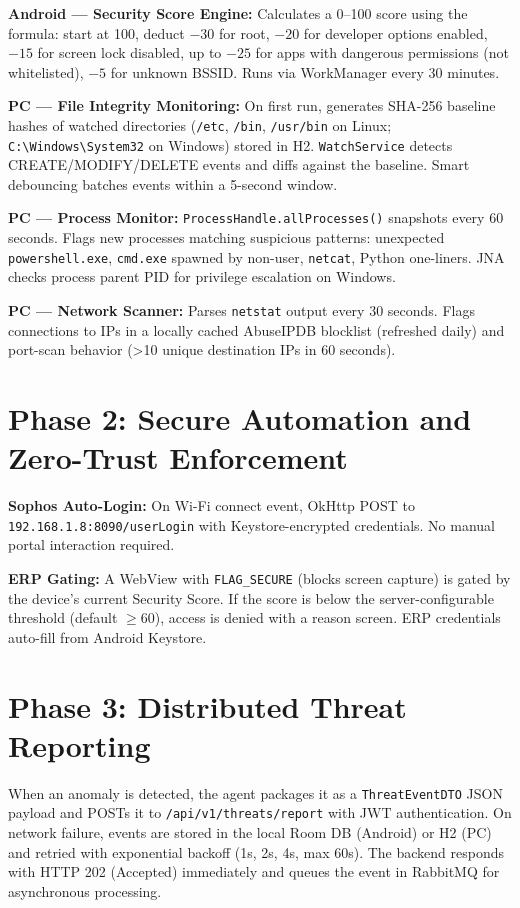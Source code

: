 \documentclass[12pt,a4paper]{report}
\begin{document}
\textbf{Android — Security Score Engine:} Calculates a 0–100 score using the formula: start at 100, deduct $-30$ for root, $-20$ for developer options enabled, $-15$ for screen lock disabled, up to $-25$ for apps with dangerous permissions (not whitelisted), $-5$ for unknown BSSID. Runs via WorkManager every 30 minutes.

\textbf{PC — File Integrity Monitoring:} On first run, generates SHA-256 baseline hashes of watched directories (\texttt{/etc}, \texttt{/bin}, \texttt{/usr/bin} on Linux; \texttt{C:\textbackslash Windows\textbackslash System32} on Windows) stored in H2. \texttt{WatchService} detects CREATE/MODIFY/DELETE events and diffs against the baseline. Smart debouncing batches events within a 5-second window.

\textbf{PC — Process Monitor:} \texttt{ProcessHandle.allProcesses()} snapshots every 60 seconds. Flags new processes matching suspicious patterns: unexpected \texttt{powershell.exe}, \texttt{cmd.exe} spawned by non-user, \texttt{netcat}, Python one-liners. JNA checks process parent PID for privilege escalation on Windows.

\textbf{PC — Network Scanner:} Parses \texttt{netstat} output every 30 seconds. Flags connections to IPs in a locally cached AbuseIPDB blocklist (refreshed daily) and port-scan behavior (>10 unique destination IPs in 60 seconds).

\section{Phase 2: Secure Automation and Zero-Trust Enforcement}

\textbf{Sophos Auto-Login:} On Wi-Fi connect event, OkHttp POST to \texttt{192.168.1.8:8090/userLogin} with Keystore-encrypted credentials. No manual portal interaction required.

\textbf{ERP Gating:} A WebView with \texttt{FLAG\_SECURE} (blocks screen capture) is gated by the device's current Security Score. If the score is below the server-configurable threshold (default $\geq 60$), access is denied with a reason screen. ERP credentials auto-fill from Android Keystore.

\section{Phase 3: Distributed Threat Reporting}

When an anomaly is detected, the agent packages it as a \texttt{ThreatEventDTO} JSON payload and POSTs it to \texttt{/api/v1/threats/report} with JWT authentication. On network failure, events are stored in the local Room DB (Android) or H2 (PC) and retried with exponential backoff (1s, 2s, 4s, max 60s). The backend responds with HTTP 202 (Accepted) immediately and queues the event in RabbitMQ for asynchronous processing.
\end{document}
